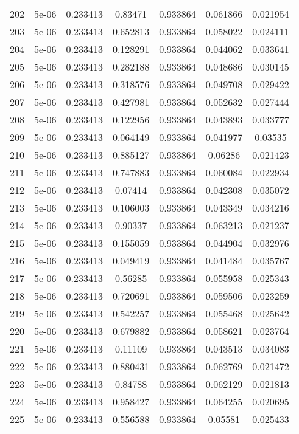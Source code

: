 \begin{table}
\begin{tabular*}{\linewidth}{c|c|c|c|c|c|c}
202 & 5e-06 & 0.233413 & 0.83471 & 0.933864 & 0.061866 & 0.021954\\
203 & 5e-06 & 0.233413 & 0.652813 & 0.933864 & 0.058022 & 0.024111\\
204 & 5e-06 & 0.233413 & 0.128291 & 0.933864 & 0.044062 & 0.033641\\
205 & 5e-06 & 0.233413 & 0.282188 & 0.933864 & 0.048686 & 0.030145\\
206 & 5e-06 & 0.233413 & 0.318576 & 0.933864 & 0.049708 & 0.029422\\
207 & 5e-06 & 0.233413 & 0.427981 & 0.933864 & 0.052632 & 0.027444\\
208 & 5e-06 & 0.233413 & 0.122956 & 0.933864 & 0.043893 & 0.033777\\
209 & 5e-06 & 0.233413 & 0.064149 & 0.933864 & 0.041977 & 0.03535\\
210 & 5e-06 & 0.233413 & 0.885127 & 0.933864 & 0.06286 & 0.021423\\
211 & 5e-06 & 0.233413 & 0.747883 & 0.933864 & 0.060084 & 0.022934\\
212 & 5e-06 & 0.233413 & 0.07414 & 0.933864 & 0.042308 & 0.035072\\
213 & 5e-06 & 0.233413 & 0.106003 & 0.933864 & 0.043349 & 0.034216\\
214 & 5e-06 & 0.233413 & 0.90337 & 0.933864 & 0.063213 & 0.021237\\
215 & 5e-06 & 0.233413 & 0.155059 & 0.933864 & 0.044904 & 0.032976\\
216 & 5e-06 & 0.233413 & 0.049419 & 0.933864 & 0.041484 & 0.035767\\
217 & 5e-06 & 0.233413 & 0.56285 & 0.933864 & 0.055958 & 0.025343\\
218 & 5e-06 & 0.233413 & 0.720691 & 0.933864 & 0.059506 & 0.023259\\
219 & 5e-06 & 0.233413 & 0.542257 & 0.933864 & 0.055468 & 0.025642\\
220 & 5e-06 & 0.233413 & 0.679882 & 0.933864 & 0.058621 & 0.023764\\
221 & 5e-06 & 0.233413 & 0.11109 & 0.933864 & 0.043513 & 0.034083\\
222 & 5e-06 & 0.233413 & 0.880431 & 0.933864 & 0.062769 & 0.021472\\
223 & 5e-06 & 0.233413 & 0.84788 & 0.933864 & 0.062129 & 0.021813\\
224 & 5e-06 & 0.233413 & 0.958427 & 0.933864 & 0.064255 & 0.020695\\
225 & 5e-06 & 0.233413 & 0.556588 & 0.933864 & 0.05581 & 0.025433\\
\end{tabular*}
\end{table}
